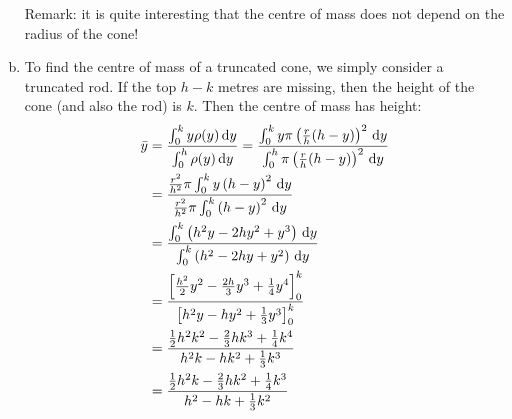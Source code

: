 \begin{solution}
\begin{enumerate}[(a)]
Remark: it is quite interesting that the centre of mass does not depend on the radius of the cone!

\item To find the centre of mass of a truncated cone, we simply consider a truncated rod. If the top $h-k$ metres are missing, then the height of the cone (and also the rod) is $k$. Then the centre of mass has height:
\begin{align*}
\bar y &= \frac{\int_0^{k} y\rho(y)\,\mathrm{d}y}{\int_0^h \rho(y)\,\mathrm{d}y} =
\frac{\int_0^{k} y\pi\left(\frac{r}{h}(h-y)\right)^2\,\mathrm{d}y}{\int_0^h \pi\left(\frac{r}{h}(h-y)\right)^2\,\mathrm{d}y}\\
& =
\frac{\frac{r^2}{h^2}\pi\int_0^{k} y\left(h-y\right)^2\,\mathrm{d}y}{\frac{r^2}{h^2}\pi\int_0^{k} \left(h-y\right)^2\,\mathrm{d}y}\\& =
\frac{\int_0^{k} \left(h^2y-2hy^2+y^3\right)\,\mathrm{d}y}{\int_0^{k} \left(h^2-2hy+y^2\right)\,\mathrm{d}y}\\
&=\frac{\left[\frac{h^2}{2}y^2-\frac{2h}{3}y^3+\frac{1}{4}y^4\right]_0^{k}}
{\left[h^2y-hy^2+\frac{1}{3}y^3\right]_0^{k}}\\
&=\frac{\frac{1}{2}h^2k^2 - \frac{2}{3}hk^3+\frac{1}{4}k^4}{h^2k-hk^2+\frac{1}{3}k^3}\\
&=\frac{\frac{1}{2}h^2k - \frac{2}{3}hk^2+\frac{1}{4}k^3}{h^2-hk+\frac{1}{3}k^2}
\end{align*}
\end{enumerate}
\end{solution}



